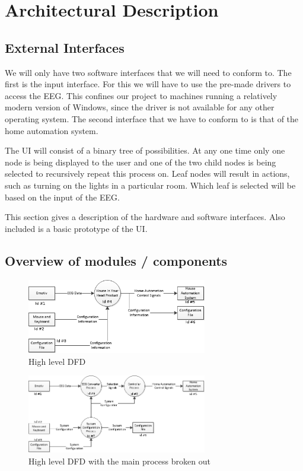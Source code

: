 \documentclass{article}
\begin{document}
\newpage

\section{Architectural Description}

\subsection{External Interfaces}

We will only have two software interfaces that we will need to conform to. The
first is the input interface. For this we will have to use the pre-made
drivers to access the EEG. This confines our project to machines running a
relatively modern version of Windows, since the driver is not available for
any other operating system. The second interface that we have to conform to is
that of the home automation system.

The UI will consist of a binary tree of possibilities. At any one time only
one node is being displayed to the user and one of the two child nodes is
being selected to recursively repeat this process on. Leaf nodes will result
in actions, such as turning on the lights in a particular room. Which leaf is
selected will be based on the input of the EEG.

This section gives a description of the hardware and software interfaces. Also included is a basic prototype of the UI.

\subsection{Overview of modules / components}

\begin{figure}[h!]
	
  \centering
    \includegraphics[width=0.7\textwidth]{DFD1}
   \caption{High level DFD}
   \label{fig:dfd1}
\end{figure}

\begin{figure}[h!]
	
  \centering
    \includegraphics[width=0.7\textwidth]{DFD2}
   \caption{High level DFD with the main process broken out}
   \label{fig:dfd2}
\end{figure}
\end{document}
